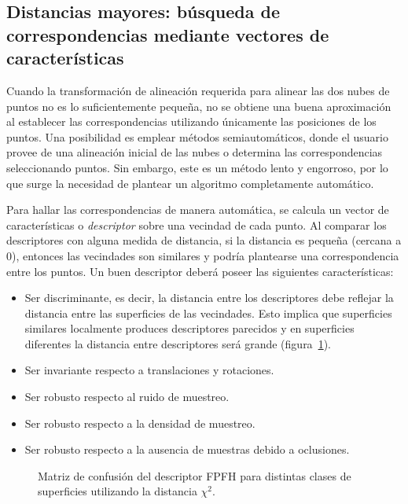 \subsection{Distancias mayores: búsqueda de correspondencias mediante vectores de características}
Cuando la transformación de alineación requerida para alinear las dos nubes de puntos
no es lo suficientemente pequeña, no se obtiene una buena aproximación al establecer las correspondencias
utilizando únicamente las posiciones de los puntos.
Una posibilidad es emplear métodos semiautomáticos, donde el usuario provee de una alineación inicial
de las nubes o determina las correspondencias seleccionando puntos.
Sin embargo, este es un método lento y engorroso,
por lo que surge la necesidad de plantear un algoritmo completamente automático.

Para hallar las correspondencias de manera automática, se calcula un vector de características o \emph{descriptor}
sobre una vecindad de cada punto. Al comparar los descriptores con alguna medida de distancia,
si la distancia es pequeña (cercana a $0$), entonces las vecindades son similares
y podría plantearse una correspondencia entre los puntos.
Un buen descriptor deberá poseer las siguientes características:
\begin{itemize}
	\item Ser discriminante, es decir, la distancia entre los descriptores debe reflejar
		la distancia entre las superficies de las vecindades.
		Esto implica que superficies similares localmente produces descriptores parecidos y
		en superficies diferentes la distancia entre descriptores será grande (figura~\ref{fig:descriptor_matriz_confusion}).
	\item Ser invariante respecto a translaciones y rotaciones.
	\item Ser robusto respecto al ruido de muestreo.
	\item Ser robusto respecto a la densidad de muestreo.
	\item Ser robusto respecto a la ausencia de muestras debido a oclusiones.
\end{itemize}

\begin{figure}
	\centering
	
	\caption[Matriz de confusión del descriptor FPFH]{\label{fig:descriptor_matriz_confusion}Matriz de confusión del descriptor FPFH para distintas clases de superficies utilizando la distancia $\chi^2$.}
\end{figure}

